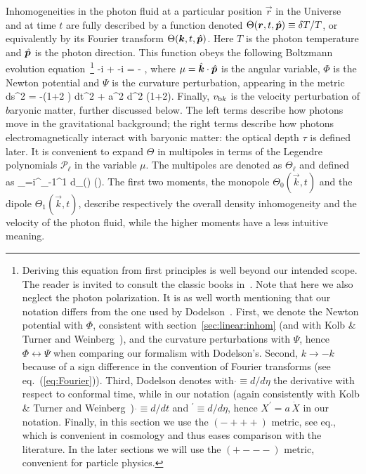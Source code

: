 Inhomogeneities in the photon fluid at a particular position $\vec r$ in the Universe and at time $t$ are fully described by a function denoted $\Theta(\bm{r}, t, \hat{\bm{p}})\equiv \delta T/T$, or equivalently by its Fourier transform $\Theta(\bm{k}, t, \hat{\bm{p}})$. Here $T$ is the photon temperature and $\hat{\bm{p}}$ is the photon direction. 
This function obeys the following Boltzmann evolution equation~\cite{cosmobooks}\footnote{\label{footnote:CMB:potentials}  
Deriving this equation from first principles is well beyond our intended scope. The reader is invited to consult the classic books in~\cite{cosmobooks}. Note that here we also neglect the photon polarization. It is as well worth mentioning that our notation differs from the one used by Dodelson~\cite{cosmobooks}. First, we denote the Newton potential with $\Phi$, consistent with section~\ref{sec:linear:inhom} (and with Kolb \& Turner and Weinberg~\cite{cosmobooks}), and the curvature perturbations with $\Psi$, hence $\Phi \leftrightarrow \Psi$ when comparing our formalism with Dodelson's. Second, $k \to -k$ because of a sign difference in the convention of Fourier transforms (see eq.~(\ref{eq:Fourier})). Third, Dodelson denotes with $\dot{} \equiv d/d\eta$ the derivative with respect to conformal time, while in our notation (again consistently with Kolb \& Turner and Weinberg~\cite{cosmobooks}) $\dot{} \equiv d/dt$ and $^\prime \equiv d/d\eta$, hence $X^\prime = a  \,\dot{X}$ in our notation.
Finally, in this section we use the $(-+++)$ metric, see eq., which is convenient in cosmology and thus eases comparison with the literature.
In the later sections we will use the $(+---)$ metric, convenient for particle physics.}
\beq
\label{eq:BoltzmannEqphotonsmain}
\dot \Theta -i  \mu \Theta + \dot  \Psi -i \mu \Phi = - \dot \tau{},
\eeq
where $\mu=\hat{\bm{k}}\cdot \hat{\bm{p}}$ is the angular variable, $\Phi$ is the Newton potential and $\Psi$ is the curvature perturbation, 
appearing in the metric
\beq \label{eq:metricPhiPsi}
ds^2 = -(1+2 \Phi) dt^2 + a^2 d^2 (1+2\Psi).\eeq
Finally, $v_{{\rm b}k}$ is the velocity perturbation of $b$aryonic matter, further discussed below. 
The left terms describe how photons move in the gravitational background; the right terms describe
how photons electromagnetically interact with baryonic matter: the optical depth $\tau$ is defined later.
It is convenient to expand $\Theta$ in multipoles in terms of the Legendre polynomials $\mathcal{P}_\ell$ in the variable $\mu$. The multipoles are denoted as $\Theta_\ell$ and defined as 
\beq
\label{eq:multipolesphotons}
\Theta_\ell =i^\ell  \int_{-1}^{1} d\mu {}_\ell(\mu) \Theta(\mu).
\eeq
The first two moments, the monopole $\Theta_0(\vec k, t)$ and the dipole $\Theta_1(\vec k, t)$, describe respectively the overall density inhomogeneity and the velocity of the photon fluid, while the higher moments have a less intuitive meaning.

